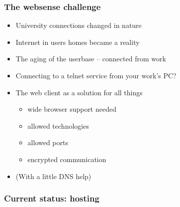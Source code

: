 \documentclass[aspectratio=169]{beamer}
\begin{document}
\begin{frame}
\frametitle{The websense challenge}
  \begin{itemize}
    \item{} University connections changed in nature
    \item{} Internet in users homes became a reality
    \item{} The aging of the userbase -- connected from work
    \item{} Connecting to a telnet service from your work's PC?
    \item{} The web client as a solution for all things
      \begin{itemize}
        \item{} wide browser support needed
        \item{} allowed technologies
        \item{} allowed ports
        \item{} encrypted communication
      \end{itemize}
    \item{} (With a little DNS help)
  \end{itemize}
\end{frame}

\begin{frame}
\frametitle{Current status: hosting}
\end{frame}
\end{document}
